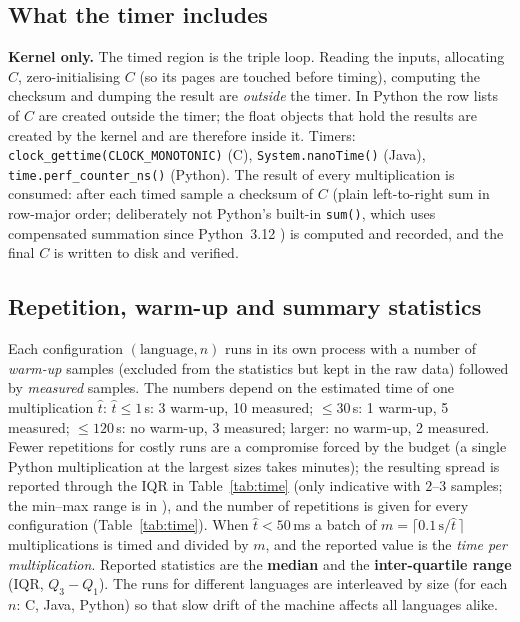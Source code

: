 \subsection{What the timer includes}
\label{sec:timer}
\textbf{Kernel only.} The timed region is the triple loop. Reading the inputs, allocating $C$, zero-initialising
$C$ (so its pages are touched before timing), computing the checksum and dumping the result are \emph{outside} the
timer. In Python the row lists of $C$ are created outside the timer; the float objects that hold the results are
created by the kernel and are therefore inside it. Timers: \texttt{clock\_gettime(CLOCK\_MONOTONIC)} (C),
\texttt{System.nanoTime()} (Java), \texttt{time.perf\_counter\_ns()} (Python). The result of every multiplication is
consumed: after each timed sample a checksum of $C$ (plain left-to-right sum in row-major order; deliberately not Python's built-in \texttt{sum()}, which uses compensated summation since Python~3.12 \cite{py312}) is computed and
recorded, and the final $C$ is written to disk and verified.

\subsection{Repetition, warm-up and summary statistics}
Each configuration $(\text{language},n)$ runs in its own process with a number of \emph{warm-up} samples
(excluded from the statistics but kept in the raw data) followed by \emph{measured} samples. The numbers depend
on the estimated time of one multiplication $\hat t$: $\hat t\le 1$\,s: 3 warm-up, 10 measured; $\le30$\,s: 1 warm-up,
5 measured; $\le120$\,s: no warm-up, 3 measured; larger: no warm-up, 2 measured. Fewer repetitions for costly runs
are a compromise forced by the budget (a single Python multiplication at the largest sizes takes minutes); the
resulting spread is reported through the IQR in Table~\ref{tab:time} (only indicative with $2$--$3$ samples; the min--max range is in
), and the number of repetitions is given for every
configuration (Table~\ref{tab:time}). When $\hat t<50$\,ms a batch of $m=\lceil 0.1\,\text{s}/\hat t\,\rceil$
multiplications is timed and divided by $m$, and the reported value is the \emph{time per multiplication}. Reported
statistics are the \textbf{median} and the \textbf{inter-quartile range} (IQR, $Q_3-Q_1$). The runs for different
languages are interleaved by size (for each $n$: C, Java, Python) so that slow drift of the machine affects all
languages alike.

